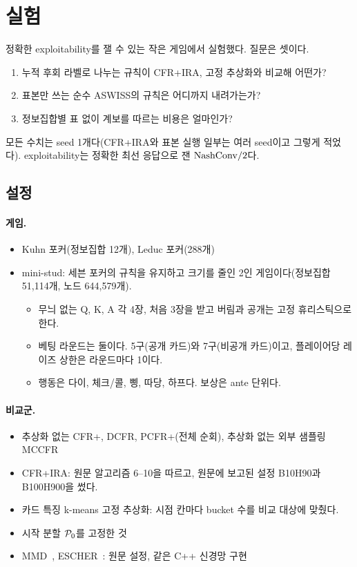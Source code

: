\section{실험}\label{sec:experiments}

정확한 exploitability를 잴 수 있는 작은 게임에서 실험했다. 질문은 셋이다.
\begin{enumerate}
  \item 누적 후회 라벨로 나누는 규칙이 CFR+IRA, 고정 추상화와 비교해 어떤가?
  \item 표본만 쓰는 순수 ASWISS의 규칙은 어디까지 내려가는가?
  \item 정보집합별 표 없이 계보를 따르는 비용은 얼마인가?
\end{enumerate}
모든 수치는 seed 1개다(CFR+IRA와 표본 실행 일부는 여러 seed이고 그렇게 적었다).
exploitability는 정확한 최선 응답으로 잰 $\mathrm{NashConv}/2$다.

\subsection{설정}\label{sec:exp-setup}
\paragraph{게임.}
\begin{itemize}
  \item Kuhn 포커(정보집합 12개), Leduc 포커(288개)
  \item mini-stud: 세븐 포커의 규칙을 유지하고 크기를 줄인 2인 게임이다(정보집합 51,114개, 노드 644,579개).
    \begin{itemize}
      \item 무늬 없는 Q, K, A 각 4장, 처음 3장을 받고 버림과 공개는 고정 휴리스틱으로 한다.
      \item 베팅 라운드는 둘이다. 5구(공개 카드)와 7구(비공개 카드)이고, 플레이어당 레이즈 상한은 라운드마다 1이다.
      \item 행동은 다이, 체크/콜, 삥, 따당, 하프다. 보상은 ante 단위다.
    \end{itemize}
\end{itemize}
\paragraph{비교군.}
\begin{itemize}
  \item 추상화 없는 CFR+, DCFR, PCFR+(전체 순회), 추상화 없는 외부 샘플링 MCCFR
  \item CFR+IRA: 원문 알고리즘 6–10을 따르고, 원문에 보고된 설정 B10H90과 B100H900을 썼다.
  \item 카드 특징 k-means 고정 추상화: 시점 칸마다 bucket 수를 비교 대상에 맞췄다.
  \item 시작 분할 $\mathcal{P}_0$를 고정한 것
  \item MMD~\citep{sokota2023unified}, ESCHER~\citep{mcaleer2023escher}: 원문 설정, 같은 C++ 신경망 구현
\end{itemize}
